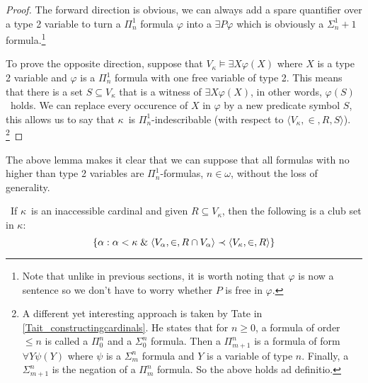 \begin{proof}
The forward direction is obvious, we can always add a spare quantifier over a type 2 variable to turn a $\Pi^1_n$ formula $\varphi$ into a $\exists P \varphi$ which is obviously a $\Sigma^1_n+1$ formula.\footnote{Note that unlike in previous sections, it is worth noting that $\varphi$ is now a sentence so we don't have to worry whether $P$ is free in $\varphi$.}

To prove the opposite direction, suppose that $V_\kappa \models \exists X \varphi(X)$ where $X$ is a type 2 variable and $\varphi$ is a $\Pi^1_n$ formula with one free variable of type 2. This means that there is a set $S \subseteq V_\kappa$ that is a witness of $\exists X \varphi(X)$, in other words, $\varphi(S)$ holds. We can replace every occurence of $X$ in $\varphi$ by a new predicate symbol $S$, this allows us to say that $\kappa$ is $\Pi^1_n$-indescribable (with respect to $\langle V_\kappa, \in, R, S \rangle$).
\footnote{A different yet interesting approach is taken by Tate in \ref{Tait_constructingcardinals}. He states that for $n\geq 0$, a formula of order $\leq n$ is called a $\Pi^n_0$ and a $\Sigma^n_0$ formula. Then a $\Pi^n_{m+1}$ is a formula of form $\forall Y \psi(Y)$ where $\psi$ is a $\Sigma^n_m$ formula and $Y$ is a variable of type $n$. Finally, a $\Sigma^n_{m+1}$ is the negation of a $\Pi^n_m$ formula. So the above holds ad definitio.}
\end{proof}

The above lemma makes it clear that we can suppose that all formulas with no higher than type 2 variables are $\Pi^1_n$-formulas, $n \in \omega$, without the loss of generality.

\begin{lemma}\label{lemma:inaccessible_clubset}\
If $\kappa$ is an inaccessible cardinal and given $R \subseteq V_\kappa$, then the following is a club set in $\kappa$:
\begin{equation}
\{\alpha : \alpha < \kappa \mathrel{\&} \langle V_\alpha, \in, R \cap V_\alpha \rangle \prec \langle V_\kappa, \in, R \rangle \}\label{eq:inacc_lemma_set}
\end{equation}
\end{lemma}

